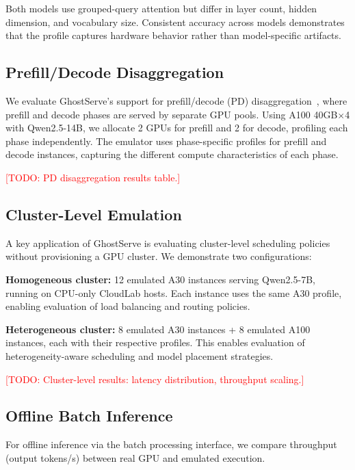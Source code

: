 \documentclass[conference]{IEEEtran}
\newcommand{\sysname}{GhostServe}
\newcommand{\todo}[1]{\textcolor{red}{[TODO: #1]}}
\begin{document}
Both models use grouped-query attention but differ in layer count, hidden dimension, and vocabulary size. Consistent accuracy across models demonstrates that the profile captures hardware behavior rather than model-specific artifacts.

\subsection{Prefill/Decode Disaggregation}

We evaluate \sysname{}'s support for prefill/decode (PD) disaggregation~\cite{patel2024splitwise}, where prefill and decode phases are served by separate GPU pools. Using A100 40GB$\times$4 with Qwen2.5-14B, we allocate 2 GPUs for prefill and 2 for decode, profiling each phase independently. The emulator uses phase-specific profiles for prefill and decode instances, capturing the different compute characteristics of each phase.

\todo{PD disaggregation results table.}

\subsection{Cluster-Level Emulation}

A key application of \sysname{} is evaluating cluster-level scheduling policies without provisioning a GPU cluster. We demonstrate two configurations:

\textbf{Homogeneous cluster:} 12 emulated A30 instances serving Qwen2.5-7B, running on CPU-only CloudLab hosts. Each instance uses the same A30 profile, enabling evaluation of load balancing and routing policies.

\textbf{Heterogeneous cluster:} 8 emulated A30 instances + 8 emulated A100 instances, each with their respective profiles. This enables evaluation of heterogeneity-aware scheduling and model placement strategies.

\todo{Cluster-level results: latency distribution, throughput scaling.}

\subsection{Offline Batch Inference}

For offline inference via the batch processing interface, we compare throughput (output tokens/s) between real GPU and emulated execution.
\end{document}
